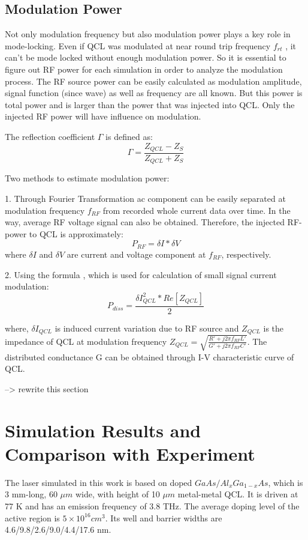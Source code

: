 \documentclass[11pt,final]{scrbook}
\begin{document}
\section{Modulation Power}
Not only modulation frequency but also modulation power plays a key role in mode-locking. Even if QCL was modulated at near round trip frequency $f_{rt}$ , it can't be mode locked without enough modulation power. So it is essential to figure out RF power for each simulation in order to analyze the modulation process. The RF source power can be easily calculated as modulation amplitude, signal function (since wave) as well as frequency are all known. But this power is total power and is larger than the power that was injected into QCL. Only the injected RF power will have influence on modulation.

The reflection coefficient $\Gamma$ is defined as:
\begin{equation}
\Gamma = \frac{Z_{QCL}-Z_{S}}{Z_{QCL}+Z_{S}}
\end{equation}

Two methods to estimate modulation power:

1. Through Fourier Transformation ac component can be easily separated at modulation frequency $f_{RF}$ from recorded whole current data over time. In the way, average RF voltage signal can also be obtained. Therefore, the injected RF-power to QCL is approximately:
\begin{equation}
 P_{RF}=\delta I* \delta V
 \end{equation}
where $\delta I$ and $ \delta V$ are current and voltage component at $f_{RF}$, respectively. 

2. Using the formula \cite{ramo2008fields}, which is used for calculation of small signal current modulation:
\begin{equation}
{ P }_{ diss }=\frac { \delta { I }_{ QCL }^{ 2 }*Re[{ Z }_{ QCL }] }{ 2 }
\end{equation}

where, $\delta { I }_{ QCL }$ is induced current variation due to RF source and ${ Z }_{ QCL }$ is the impedance of QCL at modulation frequency $Z_{QCL}=\sqrt{\frac{R'+j2\pi f_{RF}L'}{G'+j2\pi f_{RF}C'}}$. The distributed conductance G can be obtained through I-V characteristic curve of QCL.

--> rewrite this section 
\chapter{Simulation Results and Comparison with Experiment}
The laser simulated in this work is based on doped $GaAs/Al_{x}Ga_{1-x}As$, which is 3 mm-long, 60 $\mu m$ wide, with height of 10 $\mu m$ metal-metal QCL. It is driven at 77 K and has an emission frequency of 3.8 THz. The average doping level of the active region is $5\times 10^{16} cm^{3}$. Its well and barrier widths are 4.6/9.8/2.6/9.0/4.4/17.6 nm.
\end{document}
